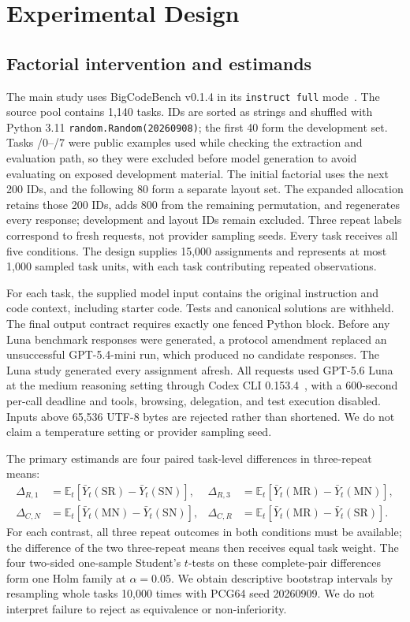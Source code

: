 \section{Experimental Design}
\subsection{Factorial intervention and estimands}
The main study uses BigCodeBench v0.1.4 in its \texttt{instruct full} mode~\cite{zhuo2024bigcodebench}. The source pool contains 1,140 tasks. IDs are sorted as strings and shuffled with Python 3.11 \texttt{random.Random(20260908)}; the first 40 form the development set. Tasks /0--/7 were public examples used while checking the extraction and evaluation path, so they were excluded before model generation to avoid evaluating on exposed development material. The initial factorial uses the next 200 IDs, and the following 80 form a separate layout set. The expanded allocation retains those 200 IDs, adds 800 from the remaining permutation, and regenerates every response; development and layout IDs remain excluded. Three repeat labels correspond to fresh requests, not provider sampling seeds. Every task receives all five conditions. The design supplies 15,000 assignments and represents at most 1,000 sampled task units, with each task contributing repeated observations.

For each task, the supplied model input contains the original instruction and code context, including starter code. Tests and canonical solutions are withheld. The final output contract requires exactly one fenced Python block. Before any Luna benchmark responses were generated, a protocol amendment replaced an unsuccessful GPT-5.4-mini run, which produced no candidate responses. The Luna study generated every assignment afresh. All requests used GPT-5.6 Luna at the medium reasoning setting through Codex CLI 0.153.4~\cite{openai56luna2026,codexexec2026}, with a 600-second per-call deadline and tools, browsing, delegation, and test execution disabled. Inputs above 65,536 UTF-8 bytes are rejected rather than shortened. We do not claim a temperature setting or provider sampling seed.

The primary estimands are four paired task-level differences in three-repeat means:
\begin{align}
\Delta_{R,1}&=\mathbb{E}_t[\bar Y_t(\mathrm{SR})-\bar Y_t(\mathrm{SN})], &
\Delta_{R,3}&=\mathbb{E}_t[\bar Y_t(\mathrm{MR})-\bar Y_t(\mathrm{MN})],\\
\Delta_{C,N}&=\mathbb{E}_t[\bar Y_t(\mathrm{MN})-\bar Y_t(\mathrm{SN})], &
\Delta_{C,R}&=\mathbb{E}_t[\bar Y_t(\mathrm{MR})-\bar Y_t(\mathrm{SR})].
\end{align}
For each contrast, all three repeat outcomes in both conditions must be available; the difference of the two three-repeat means then receives equal task weight. The four two-sided one-sample Student's $t$-tests on these complete-pair differences form one Holm family at $\alpha=0.05$. We obtain descriptive bootstrap intervals by resampling whole tasks 10,000 times with PCG64 seed 20260909. We do not interpret failure to reject as equivalence or non-inferiority.

